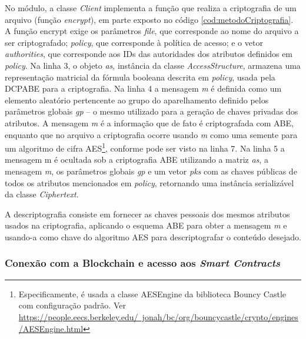 \documentclass[a4paper,11pt]{article}
\begin{document}
No módulo, a classe \emph{Client} implementa a função que realiza a criptografia de um arquivo (função \emph{encrypt}), em parte exposto no código \ref{cod:metodoCriptografia}.
A função encrypt exige os parâmetros \emph{file}, que corresponde ao nome do arquivo a ser criptografado; \emph{policy}, que corresponde à política de acesso; e o vetor \emph{authorities}, que corresponde aos IDs das autoridades dos atributos definidos em \emph{policy}.
Na linha 3, o objeto \emph{as}, instância da classe \emph{AccessStructure}, armazena uma representação matricial da fórmula booleana descrita em \emph{policy}, usada pela DCPABE para a criptografia.
Na linha 4 a mensagem \emph{m} é definida como um elemento aleatório pertencente ao grupo do aparelhamento definido pelos parâmetros globais \emph{gp} -- o mesmo utilizado para a geração de chaves privadas dos atributos.
A mensagem \emph{m} é a informação que de fato é criptografada com ABE, enquanto que no arquivo  a criptografia ocorre usando \emph{m} como uma semente para um algoritmo de cifra AES\footnote{Especificamente, é usada a classe AESEngine da biblioteca Bouncy Castle com configuração padrão. Ver \href{https://people.eecs.berkeley.edu/~jonah/bc/org/bouncycastle/crypto/engines/AESEngine.html}{https://people.eecs.berkeley.edu/~jonah/bc/org/bouncycastle/crypto/engines/AESEngine.html}}, conforme pode ser visto na linha 7.
Na linha 5 a mensagem m é ocultada sob a criptografia ABE utilizando a matriz \emph{as}, a mensagem \emph{m}, os parâmetros globais \emph{gp} e um vetor \emph{pks} com as chaves públicas de todos os atributos mencionados em \emph{policy}, retornando uma instância serializável da classe \emph{Ciphertext}.

A descriptografia consiste em fornecer as chaves pessoais dos mesmos atributos usados na criptografia, aplicando o esquema ABE para obter a mensagem \emph{m} e usando-a como chave do algoritmo AES para descriptografar o conteúdo desejado.


\subsubsection{Conexão com a Blockchain e acesso aos \textit{Smart Contracts}}
\end{document}
